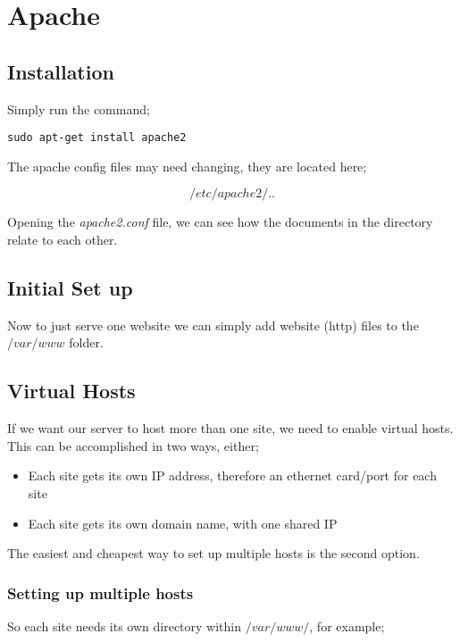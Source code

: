 \chapter{Apache}
\label{apache}

\section{Installation}

Simply run the command;

\begin{lstlisting}
sudo apt-get install apache2
\end{lstlisting}

The apache config files may need changing, they are located here;

$$
/etc/apache2/..
$$

Opening the \textit{apache2.conf} file, we can see how the documents in the directory relate to each other.

\section{Initial Set up}

Now to just serve one website we can simply add website (http) files to the $/var/www$ folder.

\section{Virtual Hosts}
\label{sec:v.hosts}

If we want our server to host more than one site, we need to enable virtual hosts.  This can be accomplished in two ways, either;

\begin{itemize}
\item Each site gets its own IP address, therefore an ethernet card/port for each site

\item Each site gets its own domain name, with one shared IP
\end{itemize}

The easiest and cheapest way to set up multiple hosts is the second option.

\subsection{Setting up multiple hosts}

So each site needs its own directory within $/var/www/$, for example;

